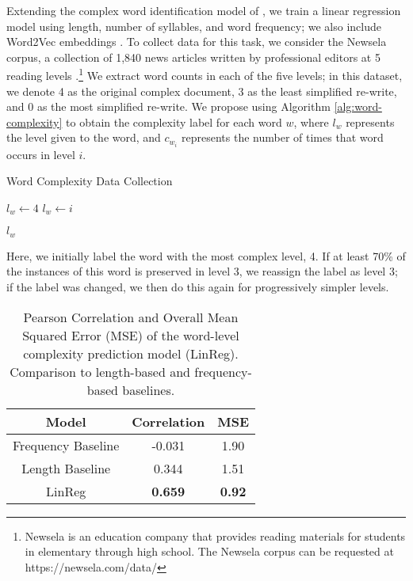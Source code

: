 \documentclass[11pt,a4paper]{article}
\begin{document}
Extending the complex word identification model of , we train a linear regression model using length, number of syllables, and word frequency; we also include Word2Vec embeddings \cite{mikolov2013distributed}. To collect data for this task, we consider the Newsela corpus, a collection of 1,840 news articles written by professional editors at 5 reading levels \cite{xu2015problems}.\footnote{Newsela is an education company that provides reading materials for students in elementary through high school. The Newsela corpus can be requested at https://newsela.com/data/} We extract word counts in each of the five levels; in this dataset, we denote 4 as the original complex document, 3 as the least simplified re-write, and 0 as the most simplified re-write. We propose using Algorithm \ref{alg:word-complexity} to obtain the complexity label for each word $w$, where $l_w$ represents the level given to the word, and $c_{w_i}$ represents the number of times that word occurs in level $i$.

\begin{algorithm}
\caption{Word Complexity Data Collection}
\label{alg:word-complexity}

\begin{algorithmic}[1]
\State $l_w \gets 4$ 
            \State $l_w \gets i$
        \EndIf
    \EndIf
\EndFor

\Return $l_w$
\EndProcedure
\end{algorithmic}
\end{algorithm}

Here, we initially label the word with the most complex level, 4. If at least 70\% of the instances of this word is preserved in level 3, we reassign the label as level 3; if the label was changed, we then do this again for progressively simpler levels.

\begin{table}
\begin{center}
\begin{tabular}{|c|c|c|} \hline
\textbf{Model} & \textbf{Correlation} & \textbf{MSE} \\ \hline
Frequency Baseline & -0.031 & 1.90 \\
Length Baseline & 0.344 & 1.51 \\
LinReg & \textbf{0.659} & \textbf{0.92} \\ \hline
\end{tabular}
\end{center}
\caption{\label{word-comp} Pearson Correlation and Overall Mean Squared Error (MSE) of the word-level complexity prediction model (LinReg). Comparison to length-based and frequency-based baselines.}
\end{table}
\end{document}
